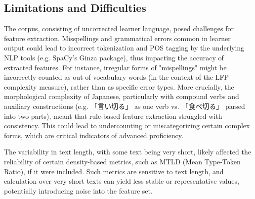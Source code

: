 \subsection{Limitations and Difficulties}


The corpus, consisting of uncorrected learner language, posed challenges for feature extraction. Misspellings and
grammatical errors common in learner output could lead to incorrect tokenization and POS tagging by the underlying
NLP tools (e.g. SpaCy's Ginza package), thus impacting the accuracy of extracted features. For instance, irregular
forms of "mispellings" might be incorrectly counted as out-of-vocabulary words (in the context of the LFP complexity
measure), rather than as specific error types. More crucially, the morphological complexity of Japanese,
particularly with compound verbs and auxiliary constructions (e.g. 「言い切る」 as one verb vs. 「食べ切る」 parsed into two
parts), meant that rule-based feature extraction struggled with consistency. This could lead to undercounting or
miscategorizing certain complex forms, which are critical indicators of advanced proficiency.

The variability in text length, with some text being very short, likely affected the reliability of certain
density-based metrics, such as MTLD (Mean Type-Token Ratio), if it were included. Such metrics are sensitive to text
length, and calculation over very short texts can yield less stable or representative values, potentially
introducing noise into the feature set.

